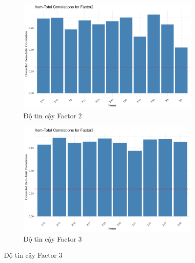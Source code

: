 \begin{figure}[h!]
    \centering
    \begin{subfigure}[b]{0.45\linewidth}
        \centering
        \includegraphics[width=\linewidth]{../../assets/images/reliability_Factor2.png}
        \caption{Độ tin cậy Factor 2}
        \label{fig:reliability_f2}
    \end{subfigure}
    \hfill
    \begin{subfigure}[b]{0.45\linewidth}
        \centering
        \includegraphics[width=\linewidth]{../../assets/images/reliability_Factor3.png}
        \caption{Độ tin cậy Factor 3}
        \label{fig:reliability_f3}
    \end{subfigure}


\end{figure}
